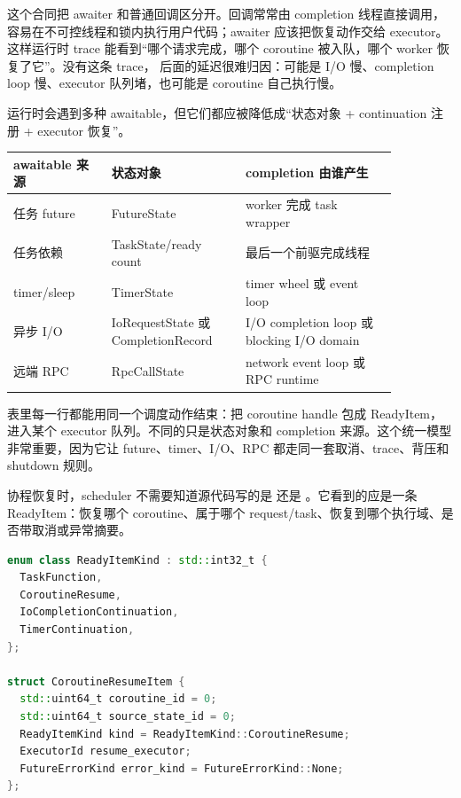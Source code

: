 这个合同把 awaiter 和普通回调区分开。回调常常由 completion 线程直接调用，容易在不可控线程和锁内执行用户代码；awaiter 应该把恢复动作交给 executor。这样运行时 trace 能看到“哪个请求完成，哪个 coroutine 被入队，哪个 worker 恢复了它”。没有这条 trace， 后面的延迟很难归因：可能是 I/O 慢、completion loop 慢、executor 队列堵，也可能是 coroutine 自己执行慢。

运行时会遇到多种 awaitable，但它们都应被降低成“状态对象 + continuation 注册 + executor 恢复”。

\begin{center}
\small
\begin{tabular}{p{0.22\linewidth}p{0.30\linewidth}p{0.34\linewidth}}
\toprule
awaitable 来源 & 状态对象 & completion 由谁产生 \\
\midrule
任务 future & FutureState & worker 完成 task wrapper \\
任务依赖 & TaskState/ready count & 最后一个前驱完成线程 \\
timer/sleep & TimerState & timer wheel 或 event loop \\
异步 I/O & IoRequestState 或 CompletionRecord & I/O completion loop 或 blocking I/O domain \\
远端 RPC & RpcCallState & network event loop 或 RPC runtime \\
\bottomrule
\end{tabular}
\end{center}

表里每一行都能用同一个调度动作结束：把 coroutine handle 包成 ReadyItem，进入某个 executor 队列。不同的只是状态对象和 completion 来源。这个统一模型非常重要，因为它让 future、timer、I/O、RPC 都走同一套取消、trace、背压和 shutdown 规则。

协程恢复时，scheduler 不需要知道源代码写的是  还是 。它看到的应是一条 ReadyItem：恢复哪个 coroutine、属于哪个 request/task、恢复到哪个执行域、是否带取消或异常摘要。

\begin{lstlisting}[language=C++,caption={协程恢复 ReadyItem 的语义字段}]
enum class ReadyItemKind : std::int32_t {
  TaskFunction,
  CoroutineResume,
  IoCompletionContinuation,
  TimerContinuation,
};

struct CoroutineResumeItem {
  std::uint64_t coroutine_id = 0;
  std::uint64_t source_state_id = 0;
  ReadyItemKind kind = ReadyItemKind::CoroutineResume;
  ExecutorId resume_executor;
  FutureErrorKind error_kind = FutureErrorKind::None;
};
\end{lstlisting}

